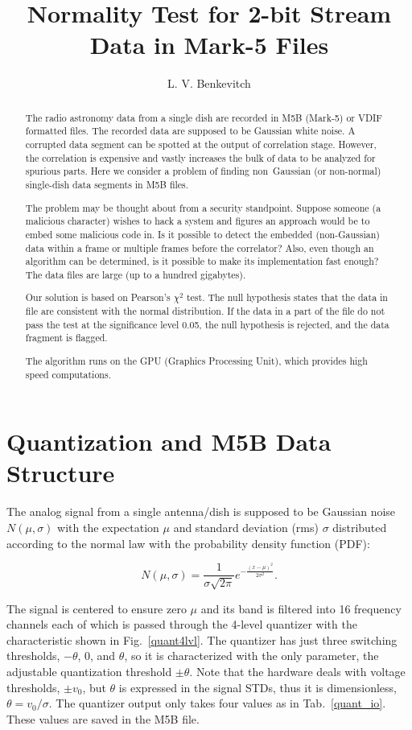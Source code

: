 \documentclass[letterpaper,twoside,12pt]{article}
\title{Normality Test for 2-bit Stream Data in Mark-5 Files}
\author[1]{L. V. Benkevitch}
\affil[1]{\small MIT Haystack observatory, Westford, MA 01886, USA.}
\begin{document}
\maketitle

\begin{abstract}
The radio astronomy data from a single dish are recorded in M5B (Mark-5) or VDIF formatted files. The recorded data are supposed to be Gaussian white noise. A corrupted data segment can be spotted at the output of correlation stage. However, the correlation is expensive and vastly increases the bulk of data to be analyzed for spurious parts. Here we consider a problem of finding non~Gaussian (or non-normal) single-dish data segments in M5B files.

The problem may be thought about from a security standpoint. Suppose someone (a malicious character) wishes to hack a system and figures an approach would be to embed some malicious code in. Is it possible to detect the embedded (non-Gaussian) data within a frame or multiple frames before the correlator? Also, even though an algorithm can be determined, is it possible to make its implementation fast enough? The data files are large (up to a hundred gigabytes).

Our solution is based on Pearson's $\chi^2$ test. The null hypothesis states that the data in file  are consistent with the normal distribution. If the data in a part of the file do not pass the test at the significance level 0.05, the null hypothesis is rejected, and the data fragment is flagged.

The algorithm runs on the GPU (Graphics Processing Unit), which provides high speed computations.
\end{abstract}


\section{Quantization and M5B Data Structure}

The analog signal from a single antenna/dish is supposed to be Gaussian noise $N(\mu,\sigma)$ with the expectation $\mu$ and standard deviation (rms) $\sigma$ distributed according to the normal law with the probability density function (PDF):

\begin{equation}
  \label{normal_pdf}
  N(\mu,\sigma) =  \frac{1}{\sigma\sqrt{2\pi}} e^{-\frac{(x-\mu)^2}{2\sigma^2}}.
\end{equation}

The signal is centered to ensure zero $\mu$ and its band is filtered into 16 frequency channels each of which is passed through the 4-level quantizer with the characteristic shown in Fig.~\ref{quant4lvl}.  The quantizer has just three switching thresholds, $-\theta$, 0, and $\theta$, so it is characterized with the only parameter, the adjustable quantization threshold $\pm\theta$. Note that the hardware deals with voltage thresholds, $\pm v_0$, but $\theta$ is expressed in the signal STDs, thus it is dimensionless, $\theta = v_0/\sigma$. The quantizer output only takes four values as in Tab.~\ref{quant_io}. These values are saved in the M5B file.
\end{document}
